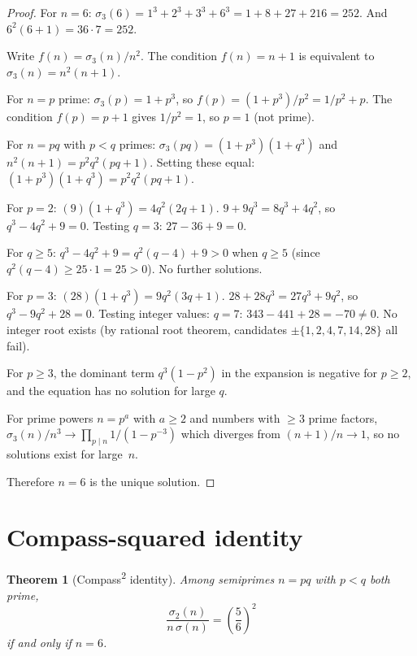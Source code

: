 \documentclass[11pt]{amsart}
\newtheorem{theorem}{Theorem}
\theoremstyle{remark}
\begin{document}
\begin{proof}
For $n = 6$: $\sigma_3(6) = 1^3 + 2^3 + 3^3 + 6^3 = 1 + 8 + 27 + 216 = 252$.
And $6^2(6 + 1) = 36 \cdot 7 = 252$. \checkmark

Write $f(n) = \sigma_3(n)/n^2$.
The condition $f(n) = n + 1$ is equivalent to $\sigma_3(n) = n^2(n+1)$.

For $n = p$ prime: $\sigma_3(p) = 1 + p^3$, so
$f(p) = (1 + p^3)/p^2 = 1/p^2 + p$.
The condition $f(p) = p + 1$ gives $1/p^2 = 1$, so $p = 1$ (not prime).

For $n = pq$ with $p < q$ primes:
$\sigma_3(pq) = (1 + p^3)(1 + q^3)$ and $n^2(n+1) = p^2 q^2(pq + 1)$.
Setting these equal:
$(1 + p^3)(1 + q^3) = p^2 q^2(pq + 1)$.

For $p = 2$: $(9)(1 + q^3) = 4q^2(2q + 1)$.
$9 + 9q^3 = 8q^3 + 4q^2$, so $q^3 - 4q^2 + 9 = 0$.
Testing $q = 3$: $27 - 36 + 9 = 0$. \checkmark

For $q \geq 5$: $q^3 - 4q^2 + 9 = q^2(q - 4) + 9 > 0$ when $q \geq 5$
(since $q^2(q-4) \geq 25 \cdot 1 = 25 > 0$). No further solutions.

For $p = 3$: $(28)(1 + q^3) = 9q^2(3q + 1)$.
$28 + 28q^3 = 27q^3 + 9q^2$, so $q^3 - 9q^2 + 28 = 0$.
Testing integer values: $q = 7$: $343 - 441 + 28 = -70 \neq 0$.
No integer root exists (by rational root theorem, candidates $\pm\{1,2,4,7,14,28\}$ all fail).

For $p \geq 3$, the dominant term $q^3(1 - p^2)$ in the expansion
is negative for $p \geq 2$, and the equation has no solution for large $q$.

For prime powers $n = p^a$ with $a \geq 2$ and numbers with $\geq 3$ prime factors,
$\sigma_3(n)/n^3 \to \prod_{p \mid n} 1/(1 - p^{-3})$ which diverges from $(n+1)/n \to 1$,
so no solutions exist for large~$n$.

Therefore $n = 6$ is the unique solution.
\end{proof}

\section{Compass-squared identity}

\begin{theorem}[Compass\textsuperscript{2} identity]\label{thm:compass-sq}
Among semiprimes $n = pq$ with $p < q$ both prime,
\[
  \frac{\sigma_2(n)}{n\,\sigma(n)} = \left(\frac{5}{6}\right)^{\!2}
\]
if and only if $n = 6$.
\end{theorem}
\end{document}
